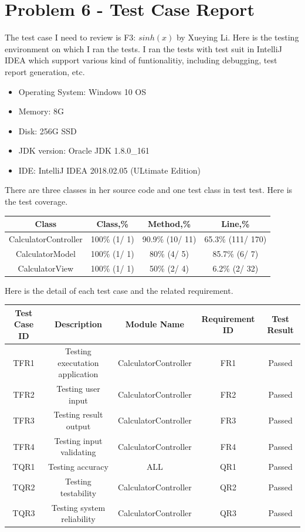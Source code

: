 \documentclass[10pt]{article}
\begin{document}
\section{Problem 6 - Test Case Report}
The test case I need to review is F3: $sinh(x)$ by Xueying Li. Here is the testing environment on which I ran the tests. I ran the tests with test suit in IntelliJ IDEA which support various kind of funtionalitiy, including debugging, test report generation, etc. 
\begin{itemize}
    \item Operating System: Windows 10 OS
    \item Memory: 8G
    \item Disk: 256G SSD
    \item JDK version: Oracle JDK 1.8.0\_161
    \item IDE: IntelliJ IDEA 2018.02.05 (ULtimate Edition)
\end{itemize} 


There are three classes in her source code and one test class in test test. Here is the test coverage.
\begin{center}
 \begin{tabular}{||c c c c||} 
 \hline
Class &	Class,\% & Method,\% & Line,\% \\
\hline
CalculatorController & 100\% (1/ 1) & 90.9\% (10/ 11) & 65.3\% (111/ 170) \\
CalculatorModel & 100\% (1/ 1) & 80\% (4/ 5) & 85.7\% (6/ 7) \\
CalculatorView & 100\% (1/ 1) & 50\% (2/ 4) & 6.2\% (2/ 32) \\
\hline
\end{tabular}
\end{center}

Here is the detail of each test case and the related requirement.
\begin{center}
 \begin{tabular}{||c c c c c||} 
 \hline
Test Case ID & Description &	Module Name & Requirement ID & Test Result \\
\hline
TFR1 & Testing executation application & CalculatorController & FR1 & Passed \\
TFR2 & Testing user input  & CalculatorController & FR2 & Passed \\
TFR3 & Testing result output & CalculatorController & FR3 & Passed \\
TFR4 & Testing input validating & CalculatorController & FR4 & Passed \\
TQR1 & Testing accuracy & ALL & QR1 & Passed \\
TQR2 & Testing testability & CalculatorController & QR2 & Passed \\
TQR3 & Testing system reliability & CalculatorController & QR3 & Passed \\
\hline
\end{tabular}
\end{center}
\end{document}
